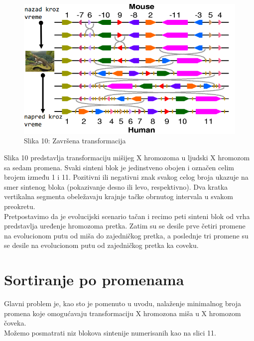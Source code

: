 \documentclass{article}
\begin{document}
\begin{figure}[h!]
\centering
\includegraphics[scale=0.32]{slike/niz7.png}
\caption{Slika 10: Završena transformacija}
\end{figure}

\newpage
Slika 10 predstavlja transformaciju mišijeg X hromozoma u ljudski X hromozom sa sedam promena. Svaki sinteni blok je jedinstveno obojen i označen celim brojem između 1 i 11. Pozitivni ili negativni znak svakog celog broja ukazuje na smer sintenog bloka (pokazivanje desno ili levo, respektivno). Dva kratka vertikalna segmenta obeležavaju krajnje tačke obrnutog intervala u svakom preokretu.\\

Pretpostavimo da je evolucijski scenario tačan i recimo peti sinteni blok od vrha predstavlja uređenje hromozoma pretka. Zatim su se desile prve četiri promene na evolucionom putu od miša do zajedničkog pretka, a poslednje tri promene su se desile na evolucionom putu od zajedničkog pretka ka coveku.

\newpage
\section{Sortiranje po promenama}

\hspace{0.7cm} Glavni problem je, kao sto je pomenuto u uvodu, nalaženje minimalnog broja promena koje omogućavaju transformaciju X hromozona miša u X hromozom čoveka.\\

\noindent Možemo posmatrati niz blokova sintenije numerisanih kao na slici 11.\\
\end{document}
